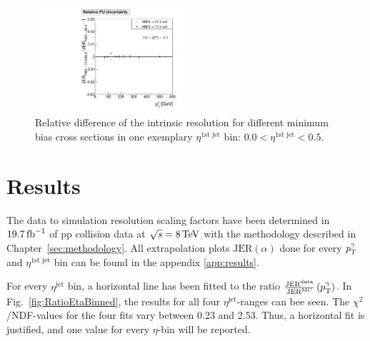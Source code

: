 \begin{figure}[h]
 \centering    
     \includegraphics[width=0.50\textwidth]{figures/resolution/systematicUncertainties/Relative_Resolution_for_1_eta_bin_PUUncertainty_RMS99.pdf}
    
  \caption{Relative difference of the intrinsic resolution for different minimum bias cross sections in one exemplary $\eta^{\text{1st jet}}$ bin: 
           $0.0<\eta^{\text{1st jet}}<0.5$.}
 \label{fig:PUuncertainty}
\end{figure}



\FloatBarrier
\chapter{Results}

The data to simulation resolution scaling factors have been determined in $19.7\,\text{fb}^{-1}$ of pp collision data at $\sqrt{s} = 8 \,\text{Te}\kern-0.06667em\text{V}$ 
with the methodology described in \mbox{Chapter~\ref{sec:methodology}}.
All extrapolation plots $\text{JER} \left( \alpha   \right)$ done for every $p_{\text{T}}^{\gamma}$ and $\eta^{\text{1st jet}}$ bin can be found in the appendix \ref{app:results}.

For every $\eta^{\text{jet}}$ bin, a horizontal line has been fitted to the ratio
$\frac{\text{JER}^{\text{data}}}{\text{JER}^{\text{MC}}} \left( p_{\text{T}}^{\gamma} \right)$.
In \mbox{Fig. \ref{fig:RatioEtaBinned}}, the results for all four $\eta^{\text{jet}}$-ranges can bee seen. 
The $\chi^2$/NDF-values for the four fits vary between 0.23 and 2.53. 
Thus, a horizontal fit is justified, and one value for every $\eta$-bin will be reported.

